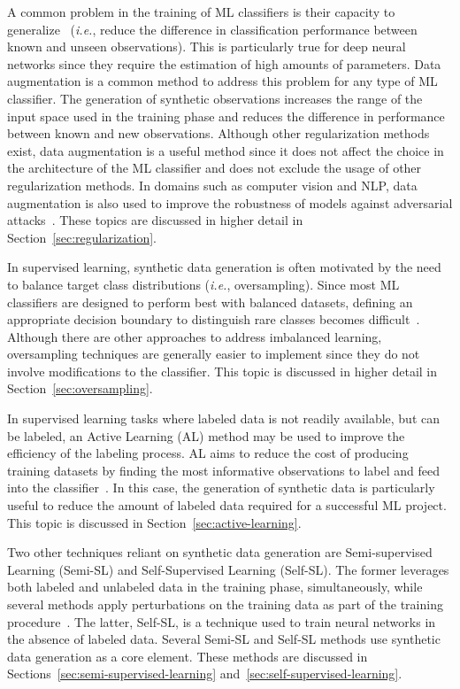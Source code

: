 A common problem in the training of ML classifiers is their
capacity to generalize~\cite{Zhang2021} (\textit{i.e.}, reduce the difference
in classification performance between known and unseen observations). This
is particularly true for deep neural networks since they require the
estimation of high amounts of parameters. Data augmentation is a common
method to address this problem for any type of ML classifier. The generation
of synthetic observations increases the range of the input space used in the
training phase and reduces the difference in performance between known and new
observations. Although other regularization methods exist, data augmentation
is a useful method since it does not affect the choice in the architecture of
the ML classifier and does not exclude the usage of other regularization
methods. In domains such as computer vision and NLP, data augmentation is also
used to improve the robustness of models against adversarial
attacks~\cite{zeng2020data, morris2020textattack}. These topics are discussed
in higher detail in Section~\ref{sec:regularization}.

In supervised learning, synthetic data generation is often motivated by the
need to balance target class distributions (\textit{i.e.}, oversampling).
Since most ML classifiers are designed to perform best with balanced datasets,
defining an appropriate decision boundary to distinguish rare classes becomes
difficult~\cite{saez2016analyzing}. Although there are other approaches to
address imbalanced learning, oversampling techniques are generally easier to
implement since they do not involve modifications to the classifier. This
topic is discussed in higher detail in Section~\ref{sec:oversampling}.

In supervised learning tasks where labeled data is not readily available, but
can be labeled, an Active Learning (AL) method may be used to improve the
efficiency of the labeling process. AL aims to reduce the cost of producing
training datasets by finding the most informative observations to label and
feed into the classifier~\cite{fonseca2021increasing}. In this case, the
generation of synthetic data is particularly useful to reduce the amount of
labeled data required for a successful ML project. This topic is discussed in
Section~\ref{sec:active-learning}.

Two other techniques reliant on synthetic data generation are Semi-supervised
Learning (Semi-SL) and Self-Supervised Learning (Self-SL). The former
leverages both labeled and unlabeled data in the training phase,
simultaneously, while several methods apply perturbations on the training data
as part of the training procedure~\cite{van2020survey}. The latter, Self-SL,
is a technique used to train neural networks in the absence of labeled data.
Several Semi-SL and Self-SL methods use synthetic data generation as a core
element. These methods are discussed in
Sections~\ref{sec:semi-supervised-learning}
and~\ref{sec:self-supervised-learning}.


